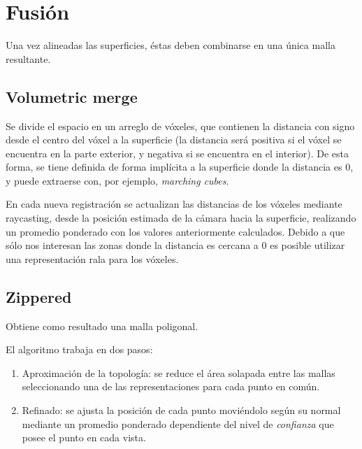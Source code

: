 	\section{Fusión}
		Una vez alineadas las superficies, éstas deben combinarse en una única malla resultante.

		\subsection{Volumetric merge}
		Se divide el espacio en un arreglo de vóxeles, que contienen la
		distancia con signo desde el centro del vóxel a la superficie (la
		distancia será positiva si el vóxel se encuentra en la parte exterior, y
		negativa si se encuentra en el interior).
		De esta forma,
		se tiene definida de forma implícita a la
		superficie donde la distancia es 0, y puede extraerse con, por ejemplo, \emph{marching cubes}.

		En cada nueva registración se actualizan las distancias de los
		vóxeles mediante raycasting,
		desde la posición estimada de la cámara hacia la superficie,
		realizando un promedio ponderado con los valores anteriormente calculados.\cite{Curless:1996:VMB:237170.237269} %
		Debido a que sólo nos interesan las zonas donde la distancia es cercana a 0 es posible utilizar una representación rala para los vóxeles.\cite{Steinbrucker:2013:LMS:2586117.2586926} %


		\subsection{Zippered}
		Obtiene como resultado una malla poligonal.

		El algoritmo trabaja en dos pasos:
		\begin{enumerate}
			\item Aproximación de la topología: se reduce el área solapada
				entre las mallas seleccionando una de las representaciones para
				cada punto en común.
			\item Refinado: se ajusta la posición de cada punto moviéndolo
				según su normal mediante un promedio ponderado dependiente del
				nivel de \emph{confianza} que posee el punto en cada vista.\cite{Turk:1994:ZPM:192161.192241}
		\end{enumerate}


